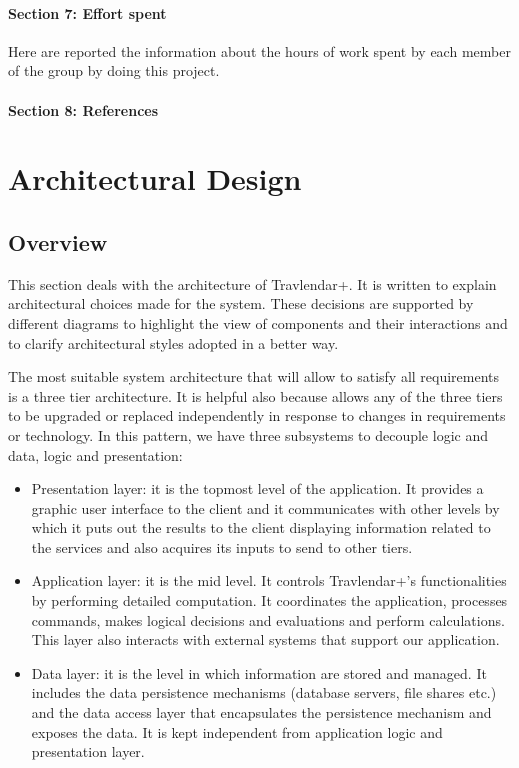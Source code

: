 \documentclass[12pt,titlepage]{article}
\begin{document}
\paragraph{Section 7: Effort spent}
Here are reported the information about the hours of work spent by each member of the group by doing this project.
\paragraph{Section 8: References}

\section{Architectural Design}
\subsection{Overview}
This section deals with the architecture of Travlendar+. It is written to explain architectural choices made for the system. These decisions are supported by different diagrams to highlight the view of components and their interactions and to clarify architectural styles adopted in a better way.

The most suitable system architecture that will allow to satisfy all requirements is a three tier architecture. It is helpful also because allows any of the three tiers to be upgraded or replaced independently in response to changes in requirements or technology.
In this pattern, we have three subsystems to decouple logic and data, logic and presentation: 
\begin{itemize}
\item Presentation layer: it is the topmost level of the application. It provides a graphic user interface to the client and it communicates with other levels by which it puts out the results to the client displaying information  related to the services and also acquires its inputs to send to other tiers.
\item Application layer:  it is the mid level. It controls Travlendar+'s functionalities by performing detailed computation. It coordinates the application, processes commands, makes logical decisions and evaluations and perform calculations. This layer also interacts with external systems that support our application.
\item Data layer: it is the level in which information are stored and managed. It includes the data persistence mechanisms (database servers, file shares etc.) and the data access layer that encapsulates the persistence mechanism and exposes the data. It is kept independent from application logic and presentation layer.
\end{itemize}
\end{document}

